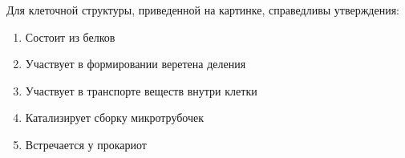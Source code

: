 
Для
клеточной структуры, приведенной на картинке, справедливы утверждения:


\begin{enumerate}
    \item Состоит из белков
    \item Участвует в формировании веретена деления
    \item Участвует в транспорте веществ внутри клетки
    \item Катализирует сборку микротрубочек
    \item Встречается у прокариот
\end{enumerate}




